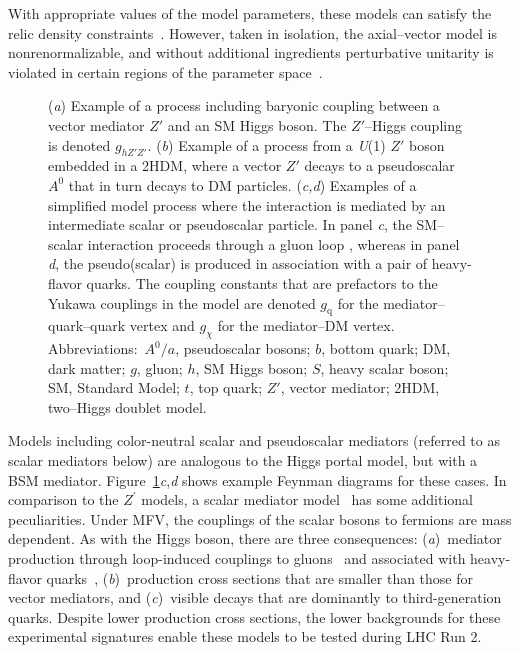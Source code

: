 \documentclass{ar-1col}
\newcommand{\chiDM}{\ensuremath{\chi}\xspace}
\newcommand{\gDM}{\ensuremath{g_{\chiDM}}\xspace}
\newcommand{\gdm}{\gDM}
\newcommand{\gq}{$g_{\mathrm{q}}$\xspace}
\newcommand{\ghZprimeZprime}{\ensuremath{g_{hZ'Z'}}\xspace}
\newcommand{\Zprime}{\ensuremath{{Z}^\prime}\xspace}
\begin{document}
{With appropriate values of the model parameters, 
these models can satisfy the relic density
constraints~\cite{Chala:2015ama}. However, taken in isolation,
the axial--vector model is nonrenormalizable, and without additional ingredients 
perturbative unitarity is violated in certain regions of the
parameter space~\cite{Chala:2015ama,Kahlhoefer:2015bea,Boveia:2016mrp}.

\begin{figure}[!htpb]
\caption{
(\textit{a}) Example of a process including baryonic coupling between a vector mediator $Z'$ and an SM Higgs boson. The $Z'$--Higgs coupling is denoted \ghZprimeZprime. 
(\textit{b}) Example of a process from a \textit{U}(1) $Z'$ boson embedded in a 2HDM, where a vector $Z'$ decays to a pseudoscalar $A^0$ that in turn decays to DM particles. 
(\textit{c,d}) Examples of a simplified model process where the interaction is mediated by an intermediate scalar or pseudoscalar particle. In panel \textit{c}, the SM--scalar interaction proceeds through a gluon loop \cite{Haisch:2013ata}, whereas in panel \textit{d}, the pseudo(scalar) is produced in association with a pair of heavy-flavor quarks. The coupling constants that are prefactors to the Yukawa couplings in the model are denoted \gq for the mediator--quark--quark vertex and \gdm for the mediator--DM vertex. 
Abbreviations:\ $A^0/a$, pseudoscalar bosons; $b$, bottom quark; DM, dark matter;  $g$, gluon; $h$, SM Higgs boson; $S$, heavy scalar boson; SM, Standard Model; $t$, top quark; $Z'$, vector mediator; 2HDM, two--Higgs doublet model. }
\label{fig:feynman_1}
\end{figure}

Models including {color-neutral scalar and pseudoscalar mediators (referred to as scalar mediators below)} are analogous
to the Higgs portal model, but with a BSM mediator. Figure~\ref{fig:feynman_1}\textit{c},\textit{d} shows example Feynman diagrams for these cases.  In comparison to the \Zprime
models, a scalar mediator
model~\cite{Buckley:2014fba} has some additional peculiarities.
Under MFV, the couplings of the scalar bosons to fermions
are mass dependent. As with the Higgs boson, there are three
consequences: (\textit{a})\ mediator production through loop-induced
couplings to gluons~\cite{Haisch:2015ioa} and associated with
heavy-flavor quarks~\cite{Buckley:2014fba}, (\textit{b})\ production
cross sections that are smaller than those for vector mediators, and (\textit{c})\ visible
decays that are dominantly to third-generation quarks.
Despite lower production cross sections, the lower backgrounds for these
experimental signatures enable these models to be tested during
LHC Run 2.

}
\end{document}
